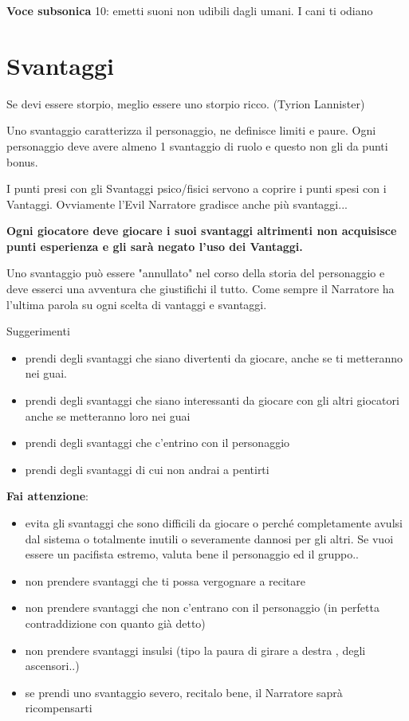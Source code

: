 \documentclass[a4paper,11pt,twoside,openany]{book}
\begin{document}
\textbf{Voce subsonica} 10: emetti suoni non udibili dagli umani. I cani ti odiano

\pagebreak

\section{Svantaggi}

\label{svantaggi}
\begin{tcolorbox}[enhanced,arc=5pt,boxrule=0.3pt]{Se devi essere storpio, meglio essere uno storpio ricco. (Tyrion Lannister)}\end{tcolorbox}\medskip

Uno svantaggio caratterizza il personaggio, ne definisce limiti e paure. Ogni personaggio deve avere almeno 1 svantaggio di ruolo e questo non gli da punti bonus.

I punti presi con gli Svantaggi psico/fisici servono a coprire i punti spesi con i Vantaggi. Ovviamente l'Evil Narratore gradisce anche più svantaggi...

\textbf{Ogni giocatore deve giocare i suoi svantaggi altrimenti non acquisisce punti esperienza e gli sarà negato l'uso dei Vantaggi.}

Uno svantaggio può essere "annullato" nel corso della storia del personaggio e deve esserci una avventura che giustifichi il tutto. Come sempre il Narratore ha l'ultima parola su ogni scelta di vantaggi e svantaggi.

\bigskip

Suggerimenti
\begin{itemize}
	\item
	      prendi degli svantaggi che siano divertenti da giocare, anche se ti metteranno nei guai.
	\item
	      prendi degli svantaggi che siano interessanti da giocare con gli altri giocatori anche se metteranno loro nei guai
	\item
	      prendi degli svantaggi che c'entrino con il personaggio
	\item
	      prendi degli svantaggi di cui non andrai a pentirti
\end{itemize}

\textbf{Fai attenzione}:

\begin{itemize}
	\item
	      evita gli svantaggi che sono difficili da giocare o perché completamente avulsi dal sistema o totalmente inutili o severamente dannosi per gli altri. Se vuoi essere un pacifista estremo, valuta bene il personaggio ed il gruppo..
	\item
	      non prendere svantaggi che ti possa vergognare a recitare
	\item
	      non prendere svantaggi che non c'entrano con il personaggio (in perfetta contraddizione con quanto già detto)
	\item
	      non prendere svantaggi insulsi (tipo la paura di girare a destra , degli ascensori..)
	\item
	      se prendi uno svantaggio severo, recitalo bene, il Narratore saprà ricompensarti
\end{itemize}
\end{document}
